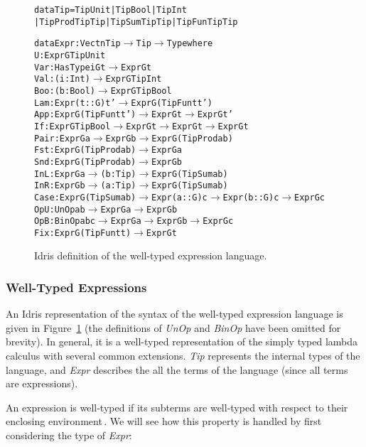 \begin{figure}
\begin{alltt}
  data Tip = TipUnit | TipBool | TipInt 
           | TipProd Tip Tip | TipSum Tip Tip | TipFun Tip Tip

  data Expr : Vect n Tip \(\rightarrow\) Tip \(\rightarrow\) Type where
    U    : Expr G TipUnit
    Var  : HasType i G t \(\rightarrow\) Expr G t
    Val  : (i : Int) \(\rightarrow\) Expr G TipInt
    Boo  : (b : Bool) \(\rightarrow\) Expr G TipBool
    Lam  : Expr (t :: G) t' \(\rightarrow\) Expr G (TipFun t t')
    App  : Expr G (TipFun t t') \(\rightarrow\) Expr G t \(\rightarrow\) Expr G t'
    If   : Expr G TipBool \(\rightarrow\) Expr G t \(\rightarrow\) Expr G t \(\rightarrow\) Expr G t
    Pair : Expr G a \(\rightarrow\) Expr G b \(\rightarrow\) Expr G (TipProd a b)
    Fst  : Expr G (TipProd a b) \(\rightarrow\) Expr G a
    Snd  : Expr G (TipProd a b) \(\rightarrow\) Expr G b
    InL  : Expr G a \(\rightarrow\) (b: Tip) \(\rightarrow\) Expr G (TipSum a b)
    InR  : Expr G b \(\rightarrow\) (a: Tip) \(\rightarrow\) Expr G (TipSum a b)
    Case : Expr G (TipSum a b) \(\rightarrow\) Expr (a :: G) c \(\rightarrow\) Expr (b :: G) c \(\rightarrow\) Expr G c
    OpU  : UnOp a b \(\rightarrow\) Expr G a \(\rightarrow\) Expr G b
    OpB  : BinOp a b c \(\rightarrow\) Expr G a \(\rightarrow\) Expr G b \(\rightarrow\) Expr G c
    Fix  : Expr G (TipFun t t) \(\rightarrow\) Expr G t
\end{alltt}
\caption{Idris definition of the well-typed expression language.}
\label{fig:idris-def-expr-lang}
\end{figure}


\subsubsection{Well-Typed Expressions}
An Idris representation of the syntax of the well-typed expression language is given in Figure~\ref{fig:idris-def-expr-lang} (the definitions of \textit{UnOp} and \textit{BinOp} have been omitted for brevity). In general, it is a well-typed representation of the simply typed lambda calculus with several common extensions. \textit{Tip} represents the internal types of the language, and \textit{Expr} describes the all the terms of the language (since all terms are expressions).

An expression is well-typed if its subterms are well-typed with respect to their enclosing environment\,\cite{Milner78atheory}. We will see how this property is handled by first considering the type of \textit{Expr}:

